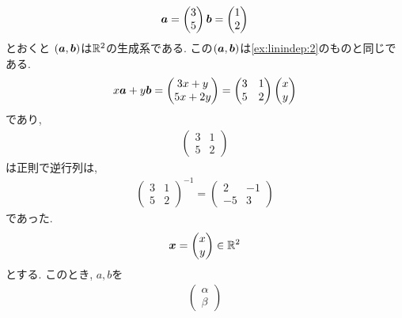 \begin{example}
  \label{ex:gens:2}
  \begin{align*}
    \boldsymbol{a}=\begin{pmatrix}3\\5\end{pmatrix}
    \boldsymbol{b}=\begin{pmatrix}1\\2\end{pmatrix}
  \end{align*}
  とおくと
  $(\boldsymbol{a},\boldsymbol{b})$は$\mathbb{R}^2$の生成系である.
  この$(\boldsymbol{a},\boldsymbol{b})$は\cref{ex:linindep:2}のものと同じである.
  \begin{align*}
    x\boldsymbol{a}+y\boldsymbol{b}=
    \begin{pmatrix}
      3x+y\\5x+2y
    \end{pmatrix}
    =
    \begin{pmatrix}
      3&1\\5&2
    \end{pmatrix}
    \begin{pmatrix}
      x\\y
    \end{pmatrix}
  \end{align*}
  であり,
  \begin{align*}
    \begin{pmatrix}
      3&1\\5&2
    \end{pmatrix}
  \end{align*}
  は正則で逆行列は,
  \begin{align*}
    \begin{pmatrix}
      3&1\\5&2
    \end{pmatrix}^{-1}
=    
    \begin{pmatrix}
      2&-1\\-5&3
    \end{pmatrix}
  \end{align*}
  であった.
  \begin{align*}
    \boldsymbol{x}=
   \begin{pmatrix}
      x\\y
    \end{pmatrix}\in\mathbb{R}^2
  \end{align*}
  とする.
  このとき, $a,b$を
  \begin{align*}
    \begin{pmatrix}
      \alpha\\\beta
    \end{pmatrix}

\end{align*}
\end{example}

